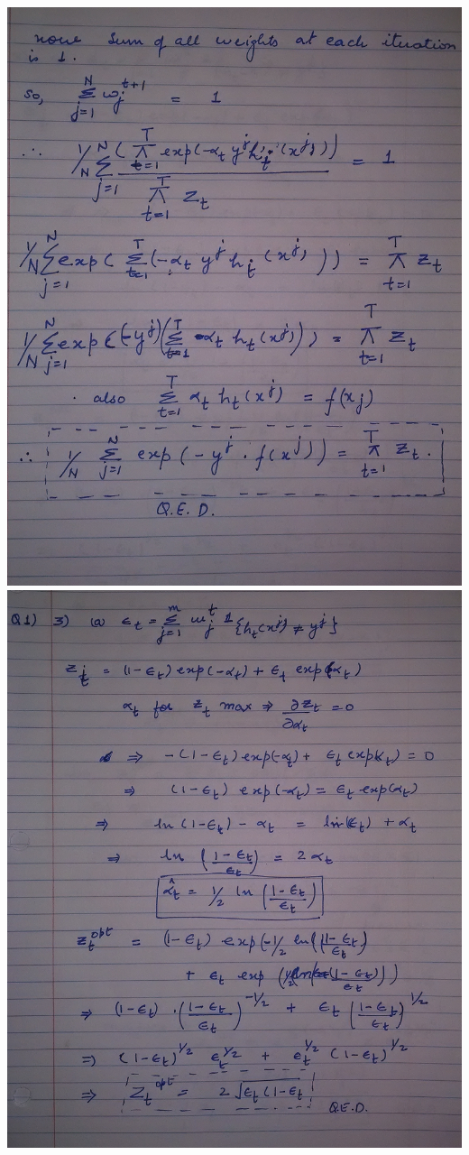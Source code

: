 \documentclass[letterpaper]{article}
\begin{document}
\includegraphics[width = 6in]{4.png}
\includegraphics[width = 6in]{5.png}
\end{document}
